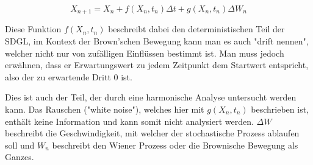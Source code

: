 \begin{equation}
	X_{n+1} = X_n + f(X_n,t_n) \Delta t + g(X_n,t_n) \Delta W_n
\end{equation}

Diese Funktion $ f(X_n,t_n) $ beschreibt dabei den deterministischen Teil der SDGL, im Kontext der Brown'schen Bewegung kann man es auch "drift nennen", welcher nicht nur von zufälligen Einflüssen bestimmt ist. Man muss jedoch erwähnen, dass er Erwartungswert zu jedem Zeitpunkt dem Startwert entspricht, also der zu erwartende Dritt 0 ist. 


Dies ist auch der Teil, der durch eine harmonische Analyse untersucht werden kann. Das Rauschen ("white noise"), welches hier mit $ g(X_n,t_n) $ beschrieben ist, enthält keine Information und kann somit nicht analysiert werden. $ \Delta W $ beschreibt die Geschwindigkeit, mit welcher der stochastische Prozess ablaufen soll und $ W_n $  beschreibt den Wiener Prozess oder die Brownische Bewegung als Ganzes.

